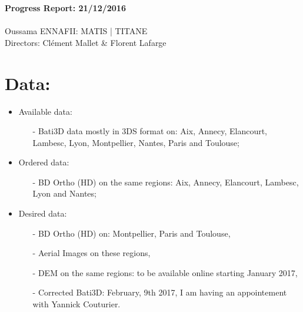 \documentclass[a4paper, 11pt]{article}
\begin{document}
	\begin{centering}
		\large\textbf{Progress Report: 21/12/2016}\\
		~\\
		Oussama ENNAFII:
		\normalsize MATIS | TITANE \\
		Directors: Cl\'ement Mallet \& Florent Lafarge \\
	\end{centering}


	\section*{Data:}
	
	\begin{itemize}
		\item Available data:
			\begin{itemize}
				\item[-] Bati3D data mostly in 3DS format on: Aix, Annecy, Elancourt, Lambesc, Lyon, Montpellier, Nantes, Paris and Toulouse;
			\end{itemize}
		\item Ordered data:
			\begin{itemize}
				\item[-] BD Ortho (HD) on the same regions: Aix, Annecy, Elancourt, Lambesc, Lyon and Nantes;
			\end{itemize}
		\item Desired data:
			\begin{itemize}
				\item[-] BD Ortho (HD) on: Montpellier, Paris and Toulouse,
				\item[-] Aerial Images on these regions,
				\item[-] DEM on the same regions: to be available online starting January 2017,
				\item[-] Corrected Bati3D: February, 9th 2017, I am having an appointement with Yannick Couturier.
			\end{itemize}
	\end{itemize}
	
\end{document}
